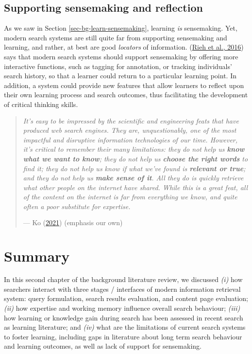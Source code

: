 \documentclass[letterpaper, nobind]{templates/ociamthesis}
\begin{document}
\hypertarget{sec-bg-search-sensemaking}{%
\subsection{Supporting sensemaking and reflection}\label{sec-bg-search-sensemaking}}

As we saw in Section \ref{sec-bg-learn-sensemaking}, learning \emph{is} sensemaking. Yet,
modern search systems are still quite far from supporting sensemaking
and learning, and rather, at best are good \emph{locators} of information.
(\protect\hyperlink{ref-rieh2016searching}{Rieh et al., 2016}) says that modern search systems should support
sensemaking by offering more interactive functions, such as tagging for
annotation, or tracking individuals' search history, so that a learner
could return to a particular learning point. In addition, a system could
provide new features that allow learners to reflect upon their own
learning process and search outcomes, thus facilitating the development
of critical thinking skills.

\begin{quote}
\emph{It's easy to be impressed by the scientific and engineering feats that have produced web search engines. They are, unquestionably, one of the most impactful and disruptive information technologies of our time. However, it's critical to remember their many limitations: they do not help us \textbf{know what we want to know}; they do not help us \textbf{choose the right words} to find it; they do not help us know if what we've found is \textbf{relevant or true}; and they do not help us \textbf{make sense of it}. All they do is quickly retrieve what other people on the internet have shared. While this is a great feat, all of the content on the internet is far from everything we know, and quite often a poor substitute for expertise.}

\hfill --- Ko (\protect\hyperlink{ref-ko2021seeking}{2021}) (emphasis our own)
\end{quote}

\hypertarget{sec-bg-search-summary}{%
\section{Summary}\label{sec-bg-search-summary}}

In this second chapter of the background literature review, we discussed
\emph{(i)} how searchers interact with three stages / interfaces of modern
information retrieval system: query formulation, search results
evaluation, and content page evaluation; \emph{(ii)} how expertise and
working memory influence overall search behaviour; \emph{(iii)} how learning
or knowledge gain during search has been assessed in recent search as
learning literature; and \emph{(iv)} what are the limitations of current
search systems to foster learning, including gaps in literature about
long term search behaviour and learning outcomes, as well as lack of
support for sensemaking.
\end{document}
